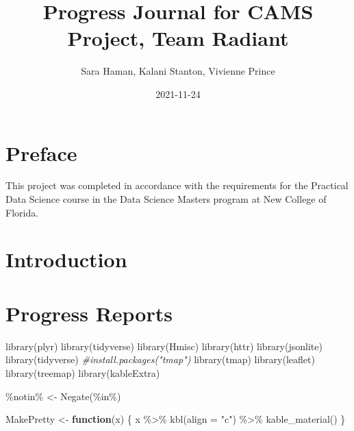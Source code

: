 \documentclass[
]{book}
\title{Progress Journal for CAMS Project, Team Radiant}
\author{Sara Haman, Kalani Stanton, Vivienne Prince}
\date{2021-11-24}
\newenvironment{Shaded}{\begin{snugshade}}{\end{snugshade}}
\newcommand{\AttributeTok}[1]{\textcolor[rgb]{0.77,0.63,0.00}{#1}}
\newcommand{\CommentTok}[1]{\textcolor[rgb]{0.56,0.35,0.01}{\textit{#1}}}
\newcommand{\ControlFlowTok}[1]{\textcolor[rgb]{0.13,0.29,0.53}{\textbf{#1}}}
\newcommand{\FunctionTok}[1]{\textcolor[rgb]{0.00,0.00,0.00}{#1}}
\newcommand{\NormalTok}[1]{#1}
\newcommand{\OtherTok}[1]{\textcolor[rgb]{0.56,0.35,0.01}{#1}}
\newcommand{\SpecialCharTok}[1]{\textcolor[rgb]{0.00,0.00,0.00}{#1}}
\newcommand{\StringTok}[1]{\textcolor[rgb]{0.31,0.60,0.02}{#1}}
\begin{document}
\maketitle

{
\setcounter{tocdepth}{1}
\tableofcontents
}
\hypertarget{preface}{%
\chapter*{Preface}\label{preface}}

This project was completed in accordance with the requirements for the Practical Data Science course in the Data Science Masters program at New College of Florida.

\hypertarget{intro}{%
\chapter{Introduction}\label{intro}}

\hypertarget{progress}{%
\chapter{Progress Reports}\label{progress}}

\begin{Shaded}
\begin{Highlighting}[]
\FunctionTok{library}\NormalTok{(plyr)}
\FunctionTok{library}\NormalTok{(tidyverse)}
\FunctionTok{library}\NormalTok{(Hmisc)}
\FunctionTok{library}\NormalTok{(httr)}
\FunctionTok{library}\NormalTok{(jsonlite)}
\FunctionTok{library}\NormalTok{(tidyverse)}
\CommentTok{\#install.packages("tmap")}
\FunctionTok{library}\NormalTok{(tmap)}
\FunctionTok{library}\NormalTok{(leaflet)}
\FunctionTok{library}\NormalTok{(treemap)}
\FunctionTok{library}\NormalTok{(kableExtra)}

\StringTok{\textasciigrave{}}\AttributeTok{\%notin\%}\StringTok{\textasciigrave{}} \OtherTok{\textless{}{-}} \FunctionTok{Negate}\NormalTok{(}\StringTok{\textasciigrave{}}\AttributeTok{\%in\%}\StringTok{\textasciigrave{}}\NormalTok{)}

\NormalTok{MakePretty }\OtherTok{\textless{}{-}} \ControlFlowTok{function}\NormalTok{(x) \{}
\NormalTok{  x }\SpecialCharTok{\%\textgreater{}\%} \FunctionTok{kbl}\NormalTok{(}\AttributeTok{align =} \StringTok{"c"}\NormalTok{) }\SpecialCharTok{\%\textgreater{}\%} \FunctionTok{kable\_material}\NormalTok{()}
\NormalTok{\}}
\end{Highlighting}
\end{Shaded}
\end{document}

